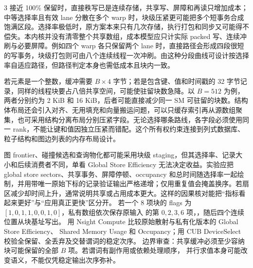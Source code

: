 \begin{solutionexercise}{3}
接近 100\% 保留时，直接秩写已是连续存储，共享写、屏障和再读只增加成本；中等选择率且有效 lane 分散在多个 warp 时，块级压紧更可能把多个短事务合成饱满区段。选择率极低时，原方案本来只有几次存储，执行打包和同步又可能得不偿失。本内核并没有清零整个共享数组，成本模型应只计实际 packed 写、连续冲刷与必要屏障。例如四个 warp 各只保留两个 lane 时，直接路径会形成四段很短的写事务，块级打包则可由八个连续线程一次冲刷。由这种分段曲线可设计按选择率自适应路径，但路径判定本身也需低成本且块内一致。

若元素是一个整数，缓冲需要 $B\times4$ 字节；若是包含键、值和时间戳的 32 字节记录，同样的线程块要占八倍共享空间，可能使驻留块数急降。以 $B=512$ 为例，两者分别约为 2 KiB 和 16 KiB，后者可能直接减少同一 SM 可驻留的块数。结构体布局还会引入对齐、无用填充和向量搬运问题，可以只缓存索引再从源数组聚集，也可采用结构分离布局分别压紧字段。无论选择哪条路线，各字段必须使用同一 rank，不能让键和值因独立压紧而错配。这个所有权约束连接到列式数据库、粒子结构和图边列表的内存布局设计。

图 frontier、碰撞候选和查询物化都可能采用块级 staging，但其选择率、记录大小和后续消费者不同，单看 Global Store Efficiency 无法决定收益。实验应把 global store sectors、共享事务、屏障停顿、occupancy 和总时间随选择率一起绘制，并用带唯一原始下标的记录验证输出严格递增；仅用重复值会掩盖换序。若扇区减少却时间上升，通常说明共享或占用成本更大。这样的因果核对能把“指标看起来更好”与“应用真正更快”区分开。
\variantheading 若一个 8 项块的 flags 为 $[1,0,1,1,0,0,1,0]$，私有数组依次保存原输入
的第 $0,2,3,6$ 项，，随后四个连续位置从块基址写出。
\practiceheading 用 Nsight Compute 比较原始散射与私有化版本的 Global Store Efficiency、
Shared Memory Usage 和 Occupancy；用 CUB DeviceSelect 校验全保留、全丢弃及交替谓词的稳定次序。
边界审查：共享缓冲必须至少容纳块可能保留的全部 $B$ 项。若谓词有副作用或依赖处理顺序，
并行求值本身可能改变语义，不能仅凭稳定输出次序弥补。
\end{solutionexercise}

